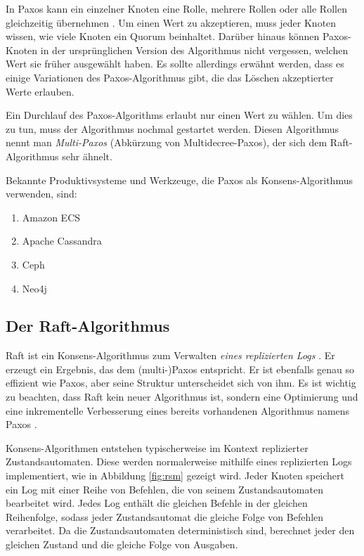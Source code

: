In Paxos kann ein einzelner Knoten eine Rolle, mehrere Rollen oder alle Rollen gleichzeitig übernehmen \cite{Lamport2001paxos-made-simple}. Um einen Wert zu akzeptieren, muss jeder Knoten wissen, wie viele Knoten ein Quorum beinhaltet. Darüber hinaus können Paxos-Knoten in der ursprünglichen Version des Algorithmus nicht vergessen, welchen Wert sie früher ausgewählt haben. Es sollte allerdings erwähnt werden, dass es einige Variationen des Paxos-Algorithmus gibt, die das Löschen akzeptierter Werte erlauben.

Ein Durchlauf des Paxos-Algorithms erlaubt nur einen Wert zu wählen. Um dies zu tun, muss der Algorithmus nochmal gestartet werden. Diesen Algorithmus nennt man \textit{Multi-Paxos} (Abkürzung von Multidecree-Paxos), der sich dem Raft-Algorithmus sehr ähnelt.

Bekannte Produktivsysteme und Werkzeuge, die Paxos als Konsens-Algorithmus verwenden, sind:

\begin{enumerate}
	\item Amazon ECS
	
	\item Apache Cassandra
	
	\item Ceph
	
	\item Neo4j
\end{enumerate}

\subsection{Der Raft-Algorithmus}

Raft ist ein Konsens-Algorithmus zum Verwalten \textit{eines replizierten Logs} \cite{Ongaro14insearch}. Er erzeugt ein Ergebnis, das dem (multi-)Paxos entspricht. Er ist ebenfalls genau so effizient wie Paxos, aber seine Struktur unterscheidet sich von ihm. Es ist wichtig zu beachten, dass Raft kein neuer Algorithmus ist, sondern eine Optimierung und eine inkrementelle Verbesserung eines bereits vorhandenen Algorithmus namens Paxos \cite{Ongaro14insearch}.

Konsens-Algorithmen entstehen typischerweise im Kontext replizierter Zustandsautomaten. Diese werden normalerweise mithilfe eines replizierten Logs implementiert, wie in Abbildung \ref{fig:rsm} gezeigt wird. Jeder Knoten speichert ein Log mit einer Reihe von Befehlen, die von seinem Zustandsautomaten bearbeitet wird. Jedes Log enthält die gleichen Befehle in der gleichen Reihenfolge, sodass jeder Zustandsautomat die gleiche Folge von Befehlen verarbeitet. Da die Zustandsautomaten deterministisch sind, berechnet jeder den gleichen Zustand und die gleiche Folge von Ausgaben.

